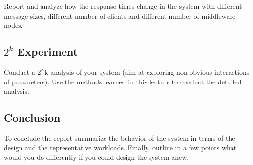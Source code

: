 \documentclass[11pt]{article}
\begin{document}
Report and analyze how the response times change in the system with
different message sizes, different number of clients and different
number of middleware nodes.

\subsection{$2^k$ Experiment}\label{sec:k-experiment}

Conduct a 2\^{}k analysis of your system (aim at exploring non-obvious
interactions of parameters). Use the methods learned in this lecture to
conduct the detailed analysis.

\subsection{Conclusion}\label{sec:conclusion}

To conclude the report summarize the behavior of the system in terms of
the design and the representative workloads. Finally, outline in a few
points what would you do differently if you could design the system
anew.
\end{document}
